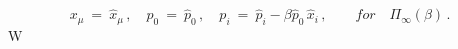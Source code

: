 \begin{equation} x_\mu \ = \ \hat{x}_\mu\,
,\quad p_0 \ = \ \hat{p}_0\, ,\quad p_i \ = \ \hat{p}_i - \beta
\hat{p}_0\, \hat{x}_i\, ,\qquad for \quad \Pi_\infty(\beta)\,
.\label{r326}\end{equation}W
